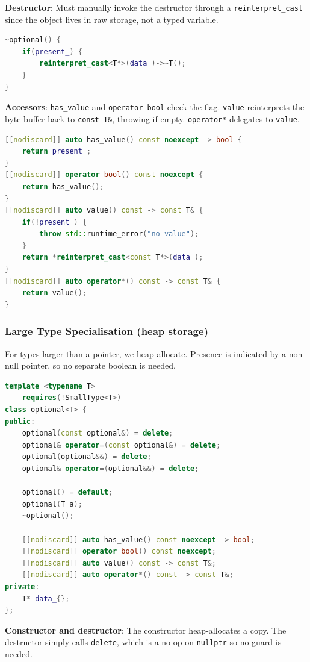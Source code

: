 \documentclass{article}
\begin{document}
\textbf{Destructor}: Must manually invoke the destructor through a \texttt{reinterpret\_cast} since the object lives in raw storage, not a typed variable.

\begin{lstlisting}[language=cpp,caption={SmallType optional: destructor}]
~optional() {
    if(present_) {
        reinterpret_cast<T*>(data_)->~T();
    }
}
\end{lstlisting}

\textbf{Accessors}: \texttt{has\_value} and \texttt{operator bool} check the flag. \texttt{value} reinterprets the byte buffer back to \texttt{const T\&}, throwing if empty. \texttt{operator*} delegates to \texttt{value}.

\begin{lstlisting}[language=cpp,caption={SmallType optional: accessors}]
[[nodiscard]] auto has_value() const noexcept -> bool {
    return present_;
}
[[nodiscard]] operator bool() const noexcept {
    return has_value();
}
[[nodiscard]] auto value() const -> const T& {
    if(!present_) {
        throw std::runtime_error("no value");
    }
    return *reinterpret_cast<const T*>(data_);
}
[[nodiscard]] auto operator*() const -> const T& {
    return value();
}
\end{lstlisting}

\subsubsection{Large Type Specialisation (heap storage)}
For types larger than a pointer, we heap-allocate. Presence is indicated by a non-null pointer, so no separate boolean is needed.

\begin{lstlisting}[language=cpp,caption={optional<T> skeleton for !SmallType}]
template <typename T>
    requires(!SmallType<T>)
class optional<T> {
public:
    optional(const optional&) = delete;
    optional& operator=(const optional&) = delete;
    optional(optional&&) = delete;
    optional& operator=(optional&&) = delete;

    optional() = default;
    optional(T a);
    ~optional();

    [[nodiscard]] auto has_value() const noexcept -> bool;
    [[nodiscard]] operator bool() const noexcept;
    [[nodiscard]] auto value() const -> const T&;
    [[nodiscard]] auto operator*() const -> const T&;
private:
    T* data_{};
};
\end{lstlisting}

\textbf{Constructor and destructor}: The constructor heap-allocates a copy. The destructor simply calls \texttt{delete}, which is a no-op on \texttt{nullptr} so no guard is needed.
\end{document}
